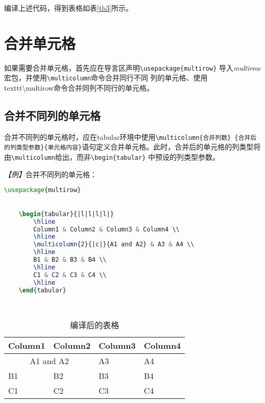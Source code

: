 编译上述代码，得到表格如表\ref{tb3}所示。

\section{合并单元格}
如果需要合并单元格，首先应在导言区声明\texttt{\textbackslash{}usepackage\{multirow\}}
导入\emph{multirow}宏包，并使用\texttt{\textbackslash{}multicolumn}命令合并同行不同
列的单元格、使用\\texttt{\textbackslash{}multirow}命令合并同列不同行的单元格。

\subsection{合并不同列的单元格}
合并不同列的单元格时，应在tabular环境中使用\texttt{\textbackslash{}multicolumn\{合并列数\}
    \{合并后的列类型参数\}\{单元格内容\}}语句定义合并单元格。此时，合并后的单元格的列类型将
由\texttt{\textbackslash{}multicolumn}给出，而非\texttt{\textbackslash{}begin\{tabular\}}
中预设的列类型参数。

\emph{【例】}合并不同列的单元格：
\begin{lstlisting}[language=TeX]
    \usepackage{multirow}
    

    \begin{tabular}{|l|l|l|l|}
        \hline
        Column1 & Column2 & Column3 & Column4 \\
        \hline
        \multicolumn{2}{|c|}{A1 and A2} & A3 & A4 \\
        \hline
        B1 & B2 & B3 & B4 \\
        \hline
        C1 & C2 & C3 & C4 \\
        \hline
    \end{tabular}

    
\end{lstlisting}

\begin{table}[h]
    \centering
    \begin{tabular}{|l|l|l|l|}
        \hline
        Column1                         & Column2 & Column3 & Column4 \\
        \hline
        \multicolumn{2}{|c|}{A1 and A2} & A3      & A4                \\
        \hline
        B1                              & B2      & B3      & B4      \\
        \hline
        C1                              & C2      & C3      & C4      \\
        \hline
    \end{tabular}
    \caption{编译后的表格}
    \label{tb4}
\end{table}

